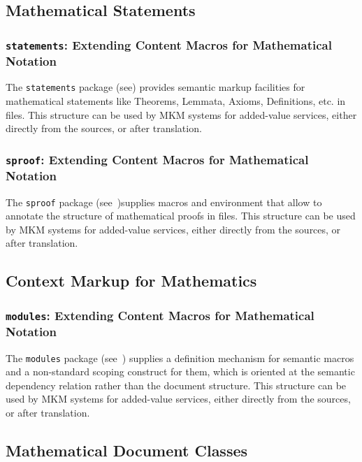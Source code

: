 \documentclass{article}
\def\ctancitesuffix{:ctan}
\def\ctancite#1{\cite{#1\ctancitesuffix}}
\begin{document}
\subsection{Mathematical Statements}

\subsubsection{{\tt{statements}}: Extending Content Macros for Mathematical Notation}
 
The \texttt{statements} package (see\ctancite{Kohlhase:smms}) provides semantic markup
facilities for mathematical statements like Theorems, Lemmata, Axioms, Definitions,
etc. in {\stex} files. This structure can be used by MKM systems for added-value services,
either directly from the {\sTeX} sources, or after translation.

\subsubsection{{\tt{sproof}}: Extending Content Macros for Mathematical Notation}
 
The \texttt{sproof} package (see~\ctancite{Kohlhase:smp})supplies macros and environment
that allow to annotate the structure of mathematical proofs in {\stex} files. This
structure can be used by MKM systems for added-value services, either directly from the
{\sTeX} sources, or after translation.


\subsection{Context Markup for Mathematics}

\subsubsection{{\tt{modules}}: Extending Content Macros for Mathematical Notation}
 
The \texttt{modules} package (see~\ctancite{KohAmb:smmssl}) supplies a definition
mechanism for semantic macros and a non-standard scoping construct for them, which is
oriented at the semantic dependency relation rather than the document structure. This
structure can be used by MKM systems for added-value services, either directly from the
{\sTeX} sources, or after translation.

\subsection{Mathematical Document Classes}
\end{document}
